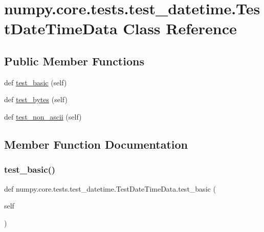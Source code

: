 \hypertarget{classnumpy_1_1core_1_1tests_1_1test__datetime_1_1TestDateTimeData}{}\section{numpy.\+core.\+tests.\+test\+\_\+datetime.\+Test\+Date\+Time\+Data Class Reference}
\label{classnumpy_1_1core_1_1tests_1_1test__datetime_1_1TestDateTimeData}
\subsection*{Public Member Functions}
\begin{DoxyCompactItemize}
\item 
def \hyperlink{classnumpy_1_1core_1_1tests_1_1test__datetime_1_1TestDateTimeData_a470673a1f1794a785c7eb1f40ed58973}{test\+\_\+basic} (self)
\item 
def \hyperlink{classnumpy_1_1core_1_1tests_1_1test__datetime_1_1TestDateTimeData_a0c4b782b870ee28bd4deb9ecd645fcd1}{test\+\_\+bytes} (self)
\item 
def \hyperlink{classnumpy_1_1core_1_1tests_1_1test__datetime_1_1TestDateTimeData_a3e31bf93af252556648a95194932ab47}{test\+\_\+non\+\_\+ascii} (self)
\end{DoxyCompactItemize}


\subsection{Member Function Documentation}
\mbox{\label{classnumpy_1_1core_1_1tests_1_1test__datetime_1_1TestDateTimeData_a470673a1f1794a785c7eb1f40ed58973}} 
\subsubsection{\texorpdfstring{test\+\_\+basic()}{test\_basic()}}
{\footnotesize\ttfamily def numpy.\+core.\+tests.\+test\+\_\+datetime.\+Test\+Date\+Time\+Data.\+test\+\_\+basic (\begin{DoxyParamCaption}\item[{}]{self }\end{DoxyParamCaption})}

